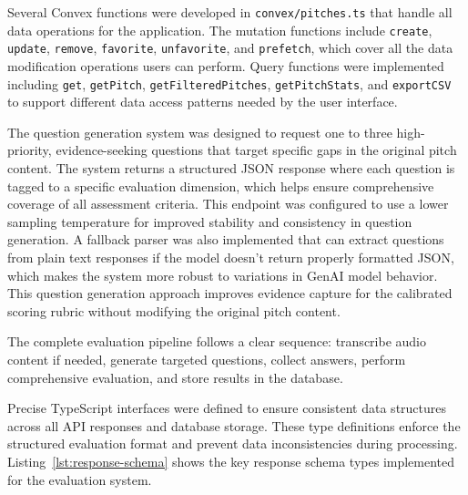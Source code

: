 Several Convex functions were developed in \texttt{convex/pitches.ts} that handle all data operations for the application. The mutation functions include \texttt{create}, \texttt{update}, \texttt{remove}, \texttt{favorite}, \texttt{unfavorite}, and \texttt{prefetch}, which cover all the data modification operations users can perform. Query functions were implemented including \texttt{get}, \texttt{getPitch}, \texttt{getFilteredPitches}, \texttt{getPitchStats}, and \texttt{exportCSV} to support different data access patterns needed by the user interface.

The question generation system was designed to request one to three high-priority, evidence-seeking questions that target specific gaps in the original pitch content. The system returns a structured JSON response where each question is tagged to a specific evaluation dimension, which helps ensure comprehensive coverage of all assessment criteria. This endpoint was configured to use a lower sampling temperature for improved stability and consistency in question generation. A fallback parser was also implemented that can extract questions from plain text responses if the model doesn't return properly formatted JSON, which makes the system more robust to variations in GenAI model behavior. This question generation approach improves evidence capture for the calibrated scoring rubric without modifying the original pitch content.

The complete evaluation pipeline follows a clear sequence: transcribe audio content if needed, generate targeted questions, collect answers, perform comprehensive evaluation, and store results in the database.

Precise TypeScript interfaces were defined to ensure consistent data structures across all API responses and database storage. These type definitions enforce the structured evaluation format and prevent data inconsistencies during processing. Listing~\ref{lst:response-schema} shows the key response schema types implemented for the evaluation system.

